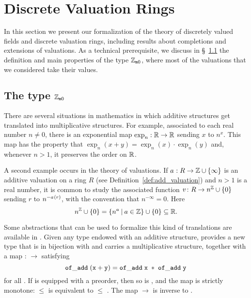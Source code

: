 \documentclass[sigplan,10pt, nonacm, review]{acmart}
\begin{document}
\section {Discrete Valuation Rings}\label{section:dvr}

In this section we present our formalization of the theory of discretely valued fields and discrete valuation rings, including results about completions and extensions of valuations. As a technical prerequisite, we discuss in \S~\ref{subsection:wzmZZ} the definition and main properties of the \mathlib type $\mathbb{Z}_{\mathtt{m}0}$, where most of the valuations that we considered take their values.

\subsection{\texorpdfstring{The type $\mathbb{Z}_{\mathtt{m}0}$}{The type with\_zero multiplicative Z}}\label{subsection:wzmZZ}
There are several situations in mathematics in which additive structures get translated into multiplicative structures. For example, associated to each real number $n \ne 0$, there is an exponential map $\exp_n : \mathbb{R} \to \mathbb{R}$ sending $x$ to $n^x$. This map has the property that
$\exp_n(x + y) = \exp_n(x) \cdot \exp_n(y)$ and, whenever $n > 1$, it preserves the order on $\mathbb{R}$.

A second example occurs in the theory of valuations. If $\av : R \to \ZZ \cup \{\infty\}$ is an additive valuation on a ring $R$ (see Definition~\ref{def:add_valuation}) and $n > 1$ is a real number, it is common to study the associated function $v \colon R \rightarrow n^{\mathbb{Z}} \cup \{0\}$ sending $r$ to $n^{-\av(r)}$, with the convention that $n^{-\infty} = 0$. Here
\[ n^{\mathbb{Z}} \cup \{0\}=\{n^a \:\vert\: a \in \mathbb{Z}\} \cup \{0\}\subseteq \mathbb{R}. \]

Some abstractions that can be used to formalize this kind of translations are available in \mathlib. Given any type  endowed with an additive structure, \mathlib provides a new type  that is in bijection with  and carries a multiplicative structure, together with a map
 :  $\rightarrow$  satisfying
\[
    \mathtt{\ of\_add\; (x + y) = of\_add\; x\; *\; of\_add\; y\ }
\]
for all . If  is equipped with a preorder, then so is , and the map  is strictly monotone:  $\le$  is equivalent to  $\le$ . The map  $\to$  is inverse to .
\end{document}
